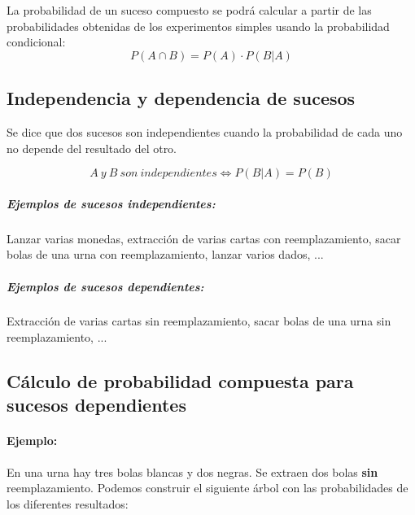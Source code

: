 La probabilidad de un suceso compuesto se podrá calcular a partir de las probabilidades obtenidas de los experimentos simples usando la probabilidad condicional:
$$P(A\cap B) = P(A) \cdot P(B|A)$$

\subsection{Independencia y dependencia de sucesos}
Se dice que dos sucesos son independientes cuando la probabilidad de cada uno no depende del resultado del otro. 

$$A\ y \ B\ son \ independientes \Longleftrightarrow P(B|A)=P(B)$$

\subparagraph{Ejemplos de sucesos independientes:}  Lanzar varias monedas, extracción de varias cartas con reemplazamiento, sacar bolas de una urna con reemplazamiento, lanzar varios dados, ...
\subparagraph{Ejemplos de sucesos dependientes:}  Extracción de varias cartas sin reemplazamiento, sacar bolas de una urna sin reemplazamiento, ...

\subsection{Cálculo de probabilidad compuesta para sucesos dependientes}
\paragraph{Ejemplo:} En una urna hay tres bolas blancas y dos negras. Se extraen dos bolas \textbf{sin} reemplazamiento. Podemos construir el siguiente árbol con las probabilidades de los diferentes resultados:

